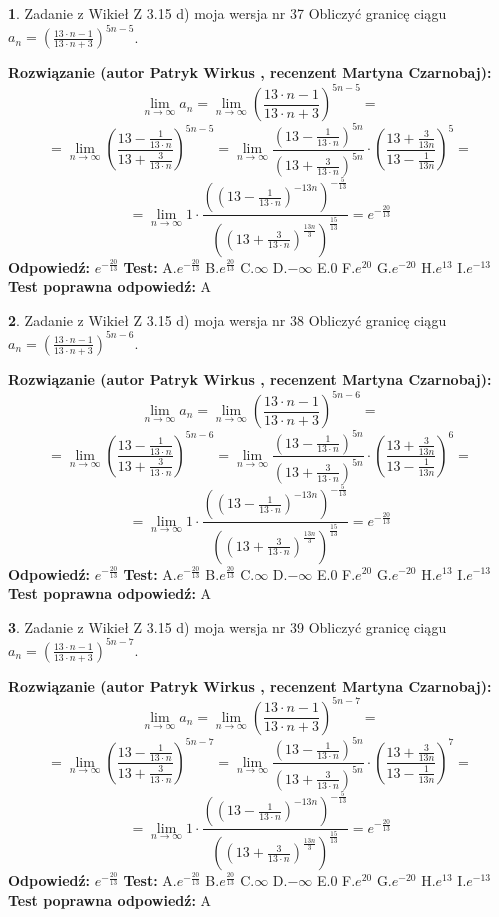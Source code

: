 \documentclass[12pt, a4paper]{article}
\theoremstyle{definition} %
\newtheorem{zad}{}
\newcommand{\zadStart}[1]{\begin{zad}#1\newline}
\newcommand{\zadStop}{\end{zad}}
\newcommand{\rozwStart}[2]{\noindent \textbf{Rozwiązanie (autor #1 , recenzent #2): }\newline}
\newcommand{\rozwStop}{\newline}
\newcommand{\odpStart}{\noindent \textbf{Odpowiedź:}\newline}
\newcommand{\odpStop}{\newline}
\newcommand{\testStart}{\noindent \textbf{Test:}\newline}
\newcommand{\testStop}{\newline}
\newcommand{\kluczStart}{\noindent \textbf{Test poprawna odpowiedź:}\newline}
\newcommand{\kluczStop}{\newline}
\begin{document}
\zadStart{Zadanie z Wikieł Z 3.15 d) moja wersja nr 37}
Obliczyć granicę ciągu $a_{n}=(\frac{13\cdot n - 1}{13 \cdot n + 3})^{5n-5}$.
\zadStop
\rozwStart{Patryk Wirkus}{Martyna Czarnobaj}
$$\lim\limits_{n\to\infty} a_{n} = \lim\limits_{n\to\infty}(\frac{13\cdot n - 1}{13 \cdot n + 3})^{5n-5}=$$
$$=\lim\limits_{n\to\infty}(\frac{13 - \frac{1}{13\cdot n}}{13 + \frac{3}{13 \cdot n}})^{5n-5}=\lim\limits_{n\to\infty}\frac{(13 - \frac{1}{13\cdot n})^{5n}}{(13 + \frac{3}{13\cdot n})^{5n}} \cdot (\frac{13+\frac{3}{13n}}{13-\frac{1}{13n}})^{5}=$$
$$=\lim\limits_{n\to\infty} 1 \cdot \frac{((13-\frac{1}{13 \cdot n})^{-13n})^{-\frac{5}{13}}}{((13+\frac{3}{13 \cdot n})^{\frac{13n}{3}})^{\frac{15}{13}}} =e^{-\frac{20}{13}}$$
\rozwStop
\odpStart
$e^{-\frac{20}{13}}$
\odpStop
\testStart
A.$ e^{-\frac{20}{13}}$
B.$ e^{\frac{20}{13}}$
C.$\infty$
D.$-\infty$
E.$0$
F.$e^{20}$
G.$e^{-20}$
H.$e^{13}$
I.$e^{-13}$
\testStop
\kluczStart
A
\kluczStop



\zadStart{Zadanie z Wikieł Z 3.15 d) moja wersja nr 38}
Obliczyć granicę ciągu $a_{n}=(\frac{13\cdot n - 1}{13 \cdot n + 3})^{5n-6}$.
\zadStop
\rozwStart{Patryk Wirkus}{Martyna Czarnobaj}
$$\lim\limits_{n\to\infty} a_{n} = \lim\limits_{n\to\infty}(\frac{13\cdot n - 1}{13 \cdot n + 3})^{5n-6}=$$
$$=\lim\limits_{n\to\infty}(\frac{13 - \frac{1}{13\cdot n}}{13 + \frac{3}{13 \cdot n}})^{5n-6}=\lim\limits_{n\to\infty}\frac{(13 - \frac{1}{13\cdot n})^{5n}}{(13 + \frac{3}{13\cdot n})^{5n}} \cdot (\frac{13+\frac{3}{13n}}{13-\frac{1}{13n}})^{6}=$$
$$=\lim\limits_{n\to\infty} 1 \cdot \frac{((13-\frac{1}{13 \cdot n})^{-13n})^{-\frac{5}{13}}}{((13+\frac{3}{13 \cdot n})^{\frac{13n}{3}})^{\frac{15}{13}}} =e^{-\frac{20}{13}}$$
\rozwStop
\odpStart
$e^{-\frac{20}{13}}$
\odpStop
\testStart
A.$ e^{-\frac{20}{13}}$
B.$ e^{\frac{20}{13}}$
C.$\infty$
D.$-\infty$
E.$0$
F.$e^{20}$
G.$e^{-20}$
H.$e^{13}$
I.$e^{-13}$
\testStop
\kluczStart
A
\kluczStop



\zadStart{Zadanie z Wikieł Z 3.15 d) moja wersja nr 39}
Obliczyć granicę ciągu $a_{n}=(\frac{13\cdot n - 1}{13 \cdot n + 3})^{5n-7}$.
\zadStop
\rozwStart{Patryk Wirkus}{Martyna Czarnobaj}
$$\lim\limits_{n\to\infty} a_{n} = \lim\limits_{n\to\infty}(\frac{13\cdot n - 1}{13 \cdot n + 3})^{5n-7}=$$
$$=\lim\limits_{n\to\infty}(\frac{13 - \frac{1}{13\cdot n}}{13 + \frac{3}{13 \cdot n}})^{5n-7}=\lim\limits_{n\to\infty}\frac{(13 - \frac{1}{13\cdot n})^{5n}}{(13 + \frac{3}{13\cdot n})^{5n}} \cdot (\frac{13+\frac{3}{13n}}{13-\frac{1}{13n}})^{7}=$$
$$=\lim\limits_{n\to\infty} 1 \cdot \frac{((13-\frac{1}{13 \cdot n})^{-13n})^{-\frac{5}{13}}}{((13+\frac{3}{13 \cdot n})^{\frac{13n}{3}})^{\frac{15}{13}}} =e^{-\frac{20}{13}}$$
\rozwStop
\odpStart
$e^{-\frac{20}{13}}$
\odpStop
\testStart
A.$ e^{-\frac{20}{13}}$
B.$ e^{\frac{20}{13}}$
C.$\infty$
D.$-\infty$
E.$0$
F.$e^{20}$
G.$e^{-20}$
H.$e^{13}$
I.$e^{-13}$
\testStop
\kluczStart
A
\kluczStop
\end{document}
